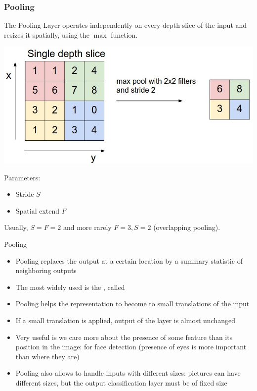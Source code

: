 \begin{frame}
	\frametitle{Pooling}

	The Pooling Layer operates independently on every depth slice of the input and resizes it spatially, using the $\max$ function.

	\begin{center}
		\includegraphics[scale=0.3]{figs/maxpool}
	\end{center}

Parameters:
\begin{itemize}
	\item Stride $S$
	\item Spatial extend $F$
\end{itemize}

Usually, $S=F=2$ and more rarely $F=3, S=2$ (overlapping pooling).
\end{frame}

\begin{frame}{Pooling}
	\begin{itemize}
		\item Pooling replaces the output at a certain location by a summary statistic of neighboring outputs

		\medskip

		\item The most widely used is the , called 

		\medskip

		\item Pooling helps the representation to become  to small translations of the input

		\medskip

		\item If a small translation is applied, output of the layer is almost unchanged

		\medskip

		\item Very useful is we care more about the presence of some feature than its position in the image: for face detection (presence of eyes is more important than where they are)

		\medskip

		\item   Pooling also allows to handle inputs with different sizes: pictures can have different sizes, but the output classification layer must be of fixed size
	\end{itemize}
\end{frame}


